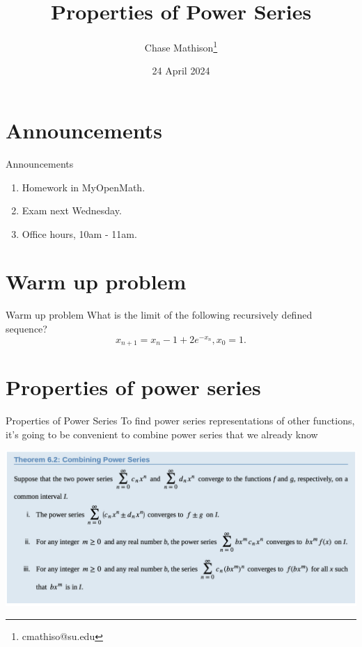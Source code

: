 \documentclass[presentation]{beamer}
\institute[SU]{Shenandoah University}
\author{Chase Mathison\thanks{cmathiso@su.edu}}
\date{24 April 2024}
\title{Properties of Power Series}
\begin{document}
\maketitle

\section{Announcements}
\label{sec:org5b14a36}
\begin{frame}[label={sec:org5dc63a9}]{Announcements}
\begin{enumerate}
\item Homework in MyOpenMath.
\item Exam next Wednesday.
\item Office hours, 10am - 11am.
\end{enumerate}
\end{frame}

\section{Warm up problem}
\label{sec:orgdc311cb}
\begin{frame}[label={sec:orgd24411d}]{Warm up problem}
What is the limit of the following recursively defined sequence?
\[
x_{n+1}  = x_n - 1 + 2e^{-x_n}, x_0 = 1.\]
\vspace{10in}
\end{frame}

\section{Properties of power series}
\label{sec:orga7ef826}
\begin{frame}[label={sec:org57cf7e8}]{Properties of Power Series}
To find power series representations of other functions,
it's going to be convenient to combine power series that we already know

\begin{center}
\begin{center}
\includegraphics[width=.9\linewidth]{../img/combiningPowSer.png}
\end{center}
\end{center}
\end{frame}
\end{document}
